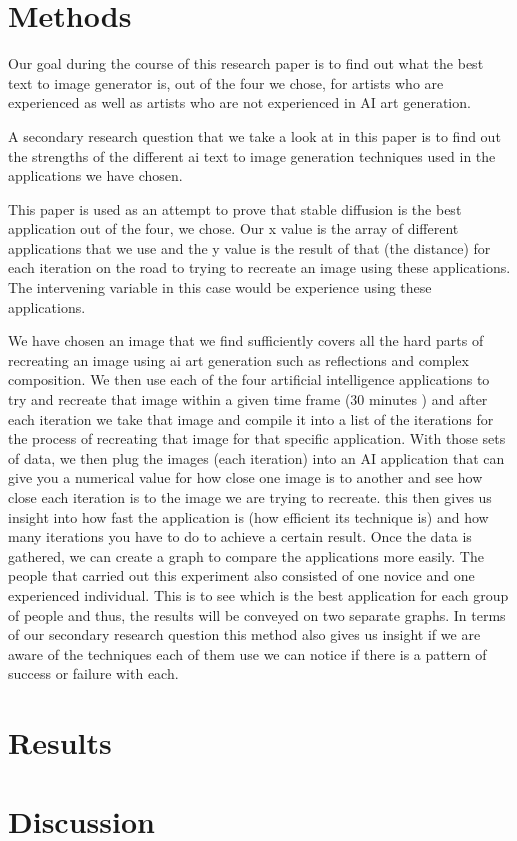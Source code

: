 \documentclass[]{report}
\begin{document}
	
	\section{Methods}
	
	Our goal during the course of this research paper is to find out what the best text to image generator is, out of the four we chose, for artists who are experienced as well as artists who are not experienced in AI art generation.
	
	A secondary research question that we take a look at in this paper is to find out the strengths of the different ai text to image generation techniques used in the applications we have chosen.
	
	This paper is used as an attempt to prove that stable diffusion is the best application out of the four, we chose. Our x value is the array of different applications that we use and the y value is the result of that (the distance) for each iteration on the road to trying to recreate an image using these applications. The intervening variable in this case would be experience using these applications.
	
	We have chosen an image that we find sufficiently covers all the hard parts of recreating an image using ai art generation such as reflections and complex composition. We then use each of the four artificial intelligence applications to try and recreate that image within a given time frame (30 minutes ) and after each iteration we take that image and compile it into a list of the iterations for the process of recreating that image for that specific application. With those sets of data, we then plug the images (each iteration) into an AI application that can give you a numerical value for how close one image is to another and see how close each iteration is to the image we are trying to recreate. this then gives us insight into how fast the application is (how efficient its technique is) and how many iterations you have to do to achieve a certain result. Once the data is gathered, we can create a graph to compare the applications more easily. The people that carried out this experiment also consisted of one novice and one experienced individual. This is to see which is the best application for each group of people and thus, the results will be conveyed on two separate graphs. In terms of our secondary research question this method also gives us insight if we are aware of the techniques each of them use we can notice if there is a pattern of success or failure with each.
	
	
	
	\section{Results}
	\newpage	
	\section{Discussion}
	
\end{document}
